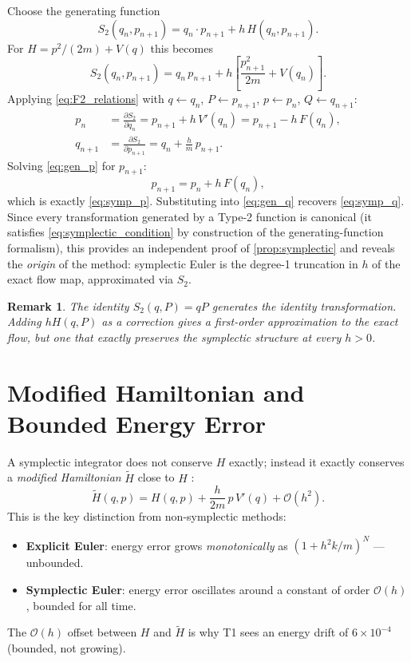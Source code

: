 \documentclass[11pt]{article}
\newtheorem{remark}[theorem]{Remark}
\newcommand{\pderiv}[2]{\frac{\partial #1}{\partial #2}}
\begin{document}
Choose the generating function
\begin{equation}\label{eq:S2}
  S_2(q_n, p_{n+1}) = q_n \cdot p_{n+1} + h\, H(q_n, p_{n+1}).
\end{equation}
For $H = p^2/(2m) + V(q)$ this becomes
\[
  S_2(q_n, p_{n+1}) = q_n\, p_{n+1} + h\!\left[\frac{p_{n+1}^2}{2m} + V(q_n)\right].
\]
Applying \eqref{eq:F2_relations} with $q \leftarrow q_n$, $P \leftarrow p_{n+1}$,
$p \leftarrow p_n$, $Q \leftarrow q_{n+1}$:
\begin{align}
  p_n &= \pderiv{S_2}{q_n} = p_{n+1} + h\, V'(q_n)
       = p_{n+1} - h\, F(q_n),
  \label{eq:gen_p}\\
  q_{n+1} &= \pderiv{S_2}{p_{n+1}} = q_n + \frac{h}{m}\, p_{n+1}.
  \label{eq:gen_q}
\end{align}
Solving \eqref{eq:gen_p} for $p_{n+1}$:
\[
  p_{n+1} = p_n + h\, F(q_n),
\]
which is exactly \eqref{eq:symp_p}.  Substituting into \eqref{eq:gen_q}
recovers \eqref{eq:symp_q}.  Since every transformation generated by a
Type-2 function is canonical (it satisfies \eqref{eq:symplectic_condition}
by construction of the generating-function formalism), this provides an
independent proof of \cref{prop:symplectic} and reveals the \emph{origin}
of the method: symplectic Euler is the degree-1 truncation in $h$ of the
exact flow map, approximated via $S_2$.

\begin{remark}
  The identity $S_2(q, P) = qP$ generates the identity transformation.
  Adding $hH(q,P)$ as a correction gives a first-order approximation to the
  exact flow, but one that \emph{exactly} preserves the symplectic structure
  at every $h > 0$.
\end{remark}

\section{Modified Hamiltonian and Bounded Energy Error}

A symplectic integrator does not conserve $H$ exactly; instead it exactly
conserves a \emph{modified Hamiltonian} $\tilde H$ close to $H$
\cite{Hairer2006,Leimkuhler2004}:
\begin{equation}\label{eq:modified_H}
  \tilde H(q,p) = H(q,p) + \frac{h}{2m}\,p\,V'(q) + \mathcal{O}(h^2).
\end{equation}
This is the key distinction from non-symplectic methods:
\begin{itemize}[leftmargin=2em]
  \item \textbf{Explicit Euler}: energy error grows \emph{monotonically} as
    $(1+h^2 k/m)^N$ --- unbounded.
  \item \textbf{Symplectic Euler}: energy error oscillates around a constant
    of order $\mathcal{O}(h)$, bounded for all time.
\end{itemize}
The $\mathcal{O}(h)$ offset between $H$ and $\tilde H$ is why T1 sees an
energy drift of $6\times 10^{-4}$ (bounded, not growing).
\end{document}
